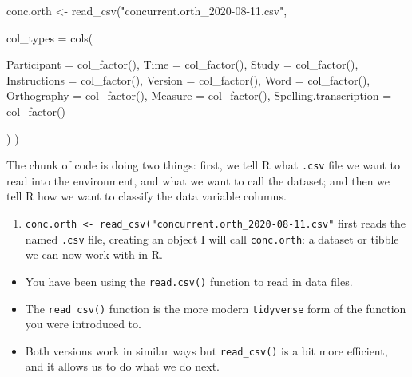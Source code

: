 \documentclass[
  letterpaper,
  DIV=11,
  numbers=noendperiod]{scrreprt}
\newenvironment{Shaded}{\begin{snugshade}}{\end{snugshade}}
\newcommand{\AttributeTok}[1]{\textcolor[rgb]{0.40,0.45,0.13}{#1}}
\newcommand{\FunctionTok}[1]{\textcolor[rgb]{0.28,0.35,0.67}{#1}}
\newcommand{\NormalTok}[1]{\textcolor[rgb]{0.00,0.23,0.31}{#1}}
\newcommand{\OtherTok}[1]{\textcolor[rgb]{0.00,0.23,0.31}{#1}}
\newcommand{\StringTok}[1]{\textcolor[rgb]{0.13,0.47,0.30}{#1}}
\providecommand{\tightlist}{%
  \setlength{\itemsep}{0pt}\setlength{\parskip}{0pt}}\usepackage{longtable,booktabs,array}
\begin{document}
\begin{Shaded}
\begin{Highlighting}[numbers=left,,]
\NormalTok{conc.orth }\OtherTok{\textless{}{-}} \FunctionTok{read\_csv}\NormalTok{(}\StringTok{"concurrent.orth\_2020{-}08{-}11.csv"}\NormalTok{,}

                      \AttributeTok{col\_types =} \FunctionTok{cols}\NormalTok{(}

                        \AttributeTok{Participant =} \FunctionTok{col\_factor}\NormalTok{(),}
                        \AttributeTok{Time =} \FunctionTok{col\_factor}\NormalTok{(),}
                        \AttributeTok{Study =} \FunctionTok{col\_factor}\NormalTok{(),}
                        \AttributeTok{Instructions =} \FunctionTok{col\_factor}\NormalTok{(),}
                        \AttributeTok{Version =} \FunctionTok{col\_factor}\NormalTok{(),}
                        \AttributeTok{Word =} \FunctionTok{col\_factor}\NormalTok{(),}
                        \AttributeTok{Orthography =} \FunctionTok{col\_factor}\NormalTok{(),}
                        \AttributeTok{Measure =} \FunctionTok{col\_factor}\NormalTok{(),}
                        \AttributeTok{Spelling.transcription =} \FunctionTok{col\_factor}\NormalTok{()}

\NormalTok{                        )}
\NormalTok{                      )}
\end{Highlighting}
\end{Shaded}

The chunk of code is doing two things: first, we tell R what
\texttt{.csv} file we want to read into the environment, and what we
want to call the dataset; and then we tell R how we want to classify the
data variable columns.

\begin{enumerate}
\def\labelenumi{\arabic{enumi}.}
\tightlist
\item
  \texttt{conc.orth\ \textless{}-\ read\_csv("concurrent.orth\_2020-08-11.csv"}
  first reads the named \texttt{.csv} file, creating an object I will
  call \texttt{conc.orth}: a dataset or tibble we can now work with in
  R.
\end{enumerate}

\begin{itemize}
\tightlist
\item
  You have been using the \texttt{read.csv()} function to read in data
  files.
\item
  The \texttt{read\_csv()} function is the more modern
  \texttt{tidyverse} form of the function you were introduced to.
\item
  Both versions work in similar ways but \texttt{read\_csv()} is a bit
  more efficient, and it allows us to do what we do next.
\end{itemize}
\end{document}

